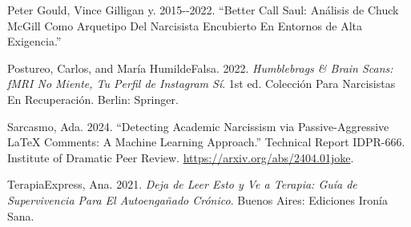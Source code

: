 \documentclass[
]{article}
\newlength{\cslhangindent}
\newenvironment{CSLReferences}[2] %
 {\begin{list}{}{%
  \setlength{\itemindent}{0pt}
  \setlength{\leftmargin}{0pt}
  \setlength{\parsep}{0pt}
  \ifodd #1
   \setlength{\leftmargin}{\cslhangindent}
   \setlength{\itemindent}{-1\cslhangindent}
  \fi
  \setlength{\itemsep}{#2\baselineskip}}}
 {\end{list}}
\begin{document}
\begin{CSLReferences}{1}{0}
Peter Gould, Vince Gilligan y. 2015-\/-2022. {``Better Call Saul:
Análisis de Chuck McGill Como Arquetipo Del Narcisista Encubierto En
Entornos de Alta Exigencia.''}

Postureo, Carlos, and María HumildeFalsa. 2022. \emph{Humblebrags \&
Brain Scans: {fMRI} No Miente, Tu Perfil de Instagram Sí}. 1st ed.
Colección Para Narcisistas En Recuperación. Berlin: Springer.

Sarcasmo, Ada. 2024. {``Detecting Academic Narcissism via
Passive-Aggressive LaTeX Comments: A Machine Learning Approach.''}
Technical Report IDPR-666. Institute of Dramatic Peer Review.
\url{https://arxiv.org/abs/2404.01joke}.

TerapiaExpress, Ana. 2021. \emph{Deja de Leer Esto y Ve a Terapia: Guía
de Supervivencia Para El Autoengañado Crónico}. Buenos Aires: Ediciones
Ironía Sana.

\end{CSLReferences}
\end{document}
